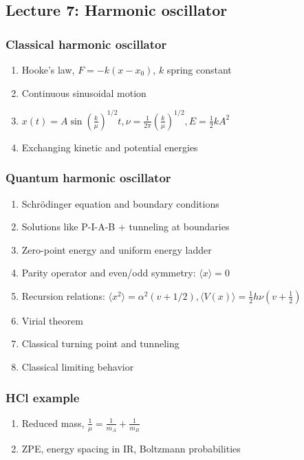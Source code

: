 \documentclass[11pt]{article}
\begin{document}
\subsection{Lecture 7: Harmonic oscillator}
\label{sec:org046f30d}
\subsubsection{Classical harmonic oscillator}
\label{sec:org5b34f36}
\begin{enumerate}
\item Hooke's law, \(F=-k(x-x_0)\), \(k\) spring constant
\item Continuous sinusoidal motion
\item \(x(t)=A \sin(\frac{k}{\mu})^{1/2}t, \nu=\frac{1}{2\pi}(\frac{k}{\mu})^{1/2}, E=\frac{1}{2}kA^2\)
\item Exchanging kinetic and potential energies
\end{enumerate}
\subsubsection{Quantum harmonic oscillator}
\label{sec:org7e5815d}
\begin{enumerate}
\item Schr\"{o}dinger equation and boundary conditions
\item Solutions like P-I-A-B + tunneling at boundaries
\item Zero-point energy and uniform energy ladder
\item Parity operator and even/odd symmetry:  \(\langle x \rangle =0\)
\item Recursion relations: \(\langle x^2 \rangle =
      \alpha^2 (v+1/2), \langle V(x) \rangle = \frac{1}{2} h\nu (v+\frac{1}{2})\)
\item Virial theorem
\item Classical turning point and tunneling
\item Classical limiting behavior
\end{enumerate}
\subsubsection{HCl example}
\label{sec:orgcb96e97}
\begin{enumerate}
\item Reduced mass, \(\frac{1}{\mu}=\frac{1}{m_A}+\frac{1}{m_B}\)
\item ZPE, energy spacing in IR, Boltzmann probabilities
\end{enumerate}
\end{document}
